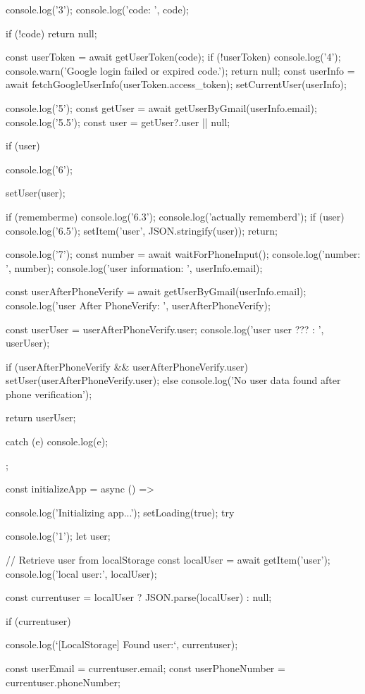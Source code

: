 {{{      console.log('3');
      console.log('code: ', code);

      if (!code) return null;

      const userToken = await getUserToken(code);
      if (!userToken) {
        console.log('4');
        console.warn('Google login failed or expired code.');
        return null;
      }
      const userInfo = await fetchGoogleUserInfo(userToken.access_token);
      setCurrentUser(userInfo);

      console.log('5');
      const getUser = await getUserByGmail(userInfo.email);
      console.log('5.5');
      const user = getUser?.user || null;

      if (user) {
        console.log('6');

        setUser(user);

        if (rememberme) {
          console.log('6.3');
          console.log('actually rememberd');
          if (user) {
            console.log('6.5');
            setItem('user', JSON.stringify(user));
          }
        }
        return;
      }
      console.log('7');
      const number = await waitForPhoneInput();
      console.log('number: ', number);
      console.log('user information: ', userInfo.email);

      const userAfterPhoneVerify = await getUserByGmail(userInfo.email);
      console.log('user After PhoneVerify: ', userAfterPhoneVerify);

      const userUser = userAfterPhoneVerify.user;
      console.log('user user ??? : ', userUser);

      if (userAfterPhoneVerify && userAfterPhoneVerify.user) {
        setUser(userAfterPhoneVerify.user);
      } else {
        console.log('No user data found after phone verification');
      }

      return userUser;
    } catch (e) {
      console.log(e);
    }
  };
  
  const initializeApp = async () => {
    console.log('Initializing app...');
    setLoading(true);
    try {
      console.log('1');
      let user;

      // Retrieve user from localStorage
      const localUser = await getItem('user');
      console.log('local user:', localUser);

      const currentuser = localUser ? JSON.parse(localUser) : null;

      if (currentuser) {
        console.log(`[LocalStorage] Found user:`, currentuser);

        const userEmail = currentuser.email;
        const userPhoneNumber = currentuser.phoneNumber;

}}}}
